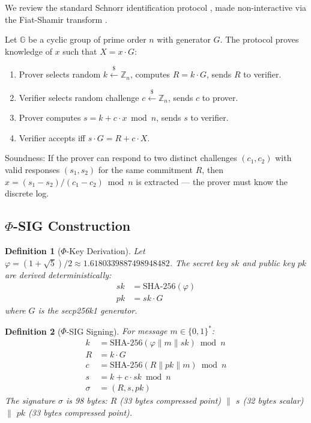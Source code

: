\documentclass{article}
\newtheorem{definition}{Definition}[section]
\begin{document}
We review the standard Schnorr identification protocol \cite{schnorr1991}, made non-interactive via the Fiat-Shamir transform \cite{fiatshamir1986}.

Let $\mathbb{G}$ be a cyclic group of prime order $n$ with generator $G$. The protocol proves knowledge of $x$ such that $X = x \cdot G$:

\begin{enumerate}
    \item Prover selects random $k \xleftarrow{\$} \mathbb{Z}_n$, computes $R = k \cdot G$, sends $R$ to verifier.
    \item Verifier selects random challenge $c \xleftarrow{\$} \mathbb{Z}_n$, sends $c$ to prover.
    \item Prover computes $s = k + c \cdot x \bmod n$, sends $s$ to verifier.
    \item Verifier accepts iff $s \cdot G = R + c \cdot X$.
\end{enumerate}

Soundness: If the prover can respond to two distinct challenges $(c_1, c_2)$ with valid responses $(s_1, s_2)$ for the same commitment $R$, then $x = (s_1 - s_2)/(c_1 - c_2) \bmod n$ is extracted — the prover must know the discrete log.

\subsection{$\Phi$-SIG Construction}

\begin{definition}[$\Phi$-Key Derivation]
Let $\varphi = (1+\sqrt{5})/2 \approx 1.6180339887498948482$. The secret key $sk$ and public key $pk$ are derived deterministically:
\begin{align}
sk &= \text{SHA-256}(\varphi) \label{eq:sk} \\
pk &= sk \cdot G \label{eq:pk}
\end{align}
where $G$ is the secp256k1 generator.
\end{definition}

\begin{definition}[$\Phi$-SIG Signing]
For message $m \in \{0,1\}^*$:
\begin{align}
k &= \text{SHA-256}(\varphi \parallel m \parallel sk) \bmod n \label{eq:nonce} \\
R &= k \cdot G \label{eq:R} \\
c &= \text{SHA-256}(R \parallel pk \parallel m) \bmod n \label{eq:c} \\
s &= k + c \cdot sk \bmod n \label{eq:s} \\
\sigma &= (R, s, pk) \label{eq:sigma}
\end{align}
The signature $\sigma$ is 98 bytes: $R$ (33 bytes compressed point) $\parallel$ $s$ (32 bytes scalar) $\parallel$ $pk$ (33 bytes compressed point).
\end{definition}
\end{document}
